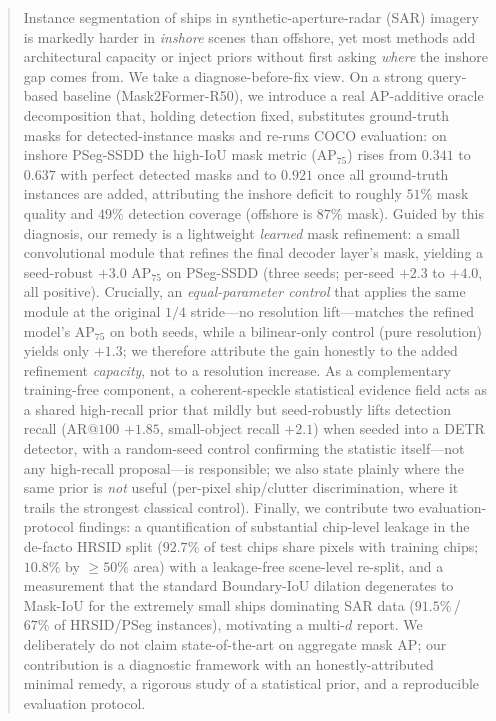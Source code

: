 \begin{abstract}
Instance segmentation of ships in synthetic-aperture-radar (SAR) imagery is markedly harder in \emph{inshore} scenes than offshore, yet most methods add architectural capacity or inject priors without first asking \emph{where} the inshore gap comes from. We take a diagnose-before-fix view. On a strong query-based baseline (Mask2Former-R50), we introduce a real AP-additive oracle decomposition that, holding detection fixed, substitutes ground-truth masks for detected-instance masks and re-runs COCO evaluation: on inshore PSeg-SSDD the high-IoU mask metric (AP$_{75}$) rises from $0.341$ to $0.637$ with perfect detected masks and to $0.921$ once all ground-truth instances are added, attributing the inshore deficit to roughly $51\%$ mask quality and $49\%$ detection coverage (offshore is $87\%$ mask). Guided by this diagnosis, our remedy is a lightweight \emph{learned} mask refinement: a small convolutional module that refines the final decoder layer's mask, yielding a seed-robust $+3.0$ AP$_{75}$ on PSeg-SSDD (three seeds; per-seed $+2.3$ to $+4.0$, all positive). Crucially, an \emph{equal-parameter control} that applies the same module at the original $1/4$ stride---no resolution lift---matches the refined model's AP$_{75}$ on both seeds, while a bilinear-only control (pure resolution) yields only $+1.3$; we therefore attribute the gain honestly to the added refinement \emph{capacity}, not to a resolution increase. As a complementary training-free component, a coherent-speckle statistical evidence field acts as a shared high-recall prior that mildly but seed-robustly lifts detection recall (AR@$100$ $+1.85$, small-object recall $+2.1$) when seeded into a DETR detector, with a random-seed control confirming the statistic itself---not any high-recall proposal---is responsible; we also state plainly where the same prior is \emph{not} useful (per-pixel ship/clutter discrimination, where it trails the strongest classical control). Finally, we contribute two evaluation-protocol findings: a quantification of substantial chip-level leakage in the de-facto HRSID split ($92.7\%$ of test chips share pixels with training chips; $10.8\%$ by $\ge\!50\%$ area) with a leakage-free scene-level re-split, and a measurement that the standard Boundary-IoU dilation degenerates to Mask-IoU for the extremely small ships dominating SAR data ($91.5\%$\,/\,$67\%$ of HRSID/PSeg instances), motivating a multi-$d$ report. We deliberately do not claim state-of-the-art on aggregate mask AP; our contribution is a diagnostic framework with an honestly-attributed minimal remedy, a rigorous study of a statistical prior, and a reproducible evaluation protocol.
\end{abstract}

